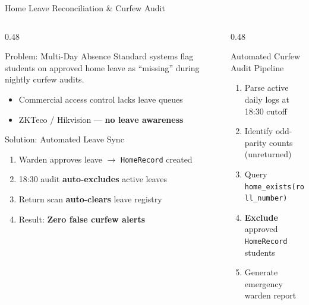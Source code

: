 \documentclass[aspectratio=169, 11pt]{beamer}
\begin{document}
\begin{frame}{Home Leave Reconciliation \& Curfew Audit}
  \begin{columns}[T]
    \begin{column}{0.48\textwidth}
      \begin{block}{Problem: Multi-Day Absence}
        \small
        Standard systems flag students on approved home leave as ``missing'' during nightly curfew audits.
        \begin{itemize}
          \item Commercial access control lacks leave queues
          \item ZKTeco / Hikvision — \textbf{no leave awareness}
        \end{itemize}
      \end{block}
      \vspace{0.2em}
      \begin{exampleblock}{Solution: Automated Leave Sync}
        \small
        \begin{enumerate}
          \item Warden approves leave $\rightarrow$ \texttt{HomeRecord} created
          \item 18:30 audit \textbf{auto-excludes} active leaves
          \item Return scan \textbf{auto-clears} leave registry
          \item Result: \textbf{Zero false curfew alerts}
        \end{enumerate}
      \end{exampleblock}
    \end{column}
    \begin{column}{0.48\textwidth}
      \begin{block}{Automated Curfew Audit Pipeline}
        \small
        \begin{enumerate}
          \item Parse active daily logs at 18:30 cutoff
          \item Identify odd-parity counts (unreturned)
          \item Query \texttt{home\_exists(roll\_number)}
          \item \textbf{Exclude} approved \texttt{HomeRecord} students
          \item Generate emergency warden report
        \end{enumerate}
      \end{block}

\end{column}
\end{columns}
\end{frame}
\end{document}
